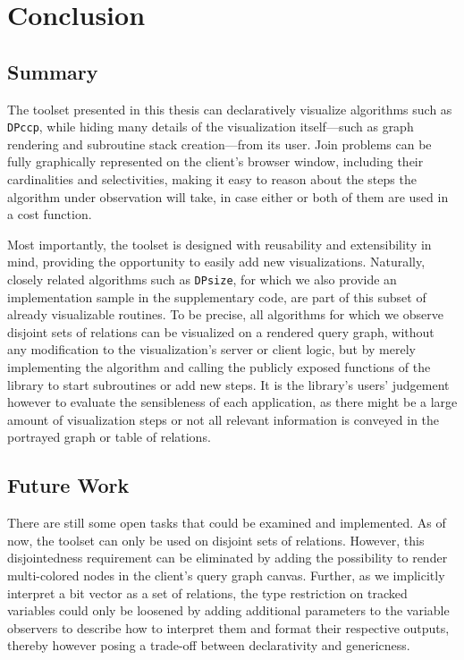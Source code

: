 \section{Conclusion}

\vspace{-0.2cm}
\subsection{Summary}

The toolset presented in this thesis can declaratively visualize algorithms such as \texttt{DPccp}, while hiding many details of the visualization itself—such as graph rendering and subroutine stack creation—from its user. Join problems can be fully graphically represented on the client's browser window, including their cardinalities and selectivities, making it easy to reason about the steps the algorithm under observation will take, in case either or both of them are used in a cost function.

 Most importantly, the toolset is designed with reusability and extensibility in mind, providing the opportunity to easily add new visualizations. Naturally, closely related algorithms such as \texttt{DPsize}\cite{moerkotte2006analysis}, for which we also provide an implementation sample in the supplementary code, are part of this subset of already visualizable routines. To be precise, all algorithms for which we observe disjoint sets of relations can be visualized on a rendered query graph, without any modification to the visualization's server or client logic, but by merely implementing the algorithm and calling the publicly exposed functions of the library to start subroutines or add new steps. It is the library's users' judgement however to evaluate the sensibleness of each application, as there might be a large amount of visualization steps or not all relevant information is conveyed in the portrayed graph or table of relations.

 \vspace{-0.1cm}
\subsection{Future Work}

There are still some open tasks that could be examined and implemented. As of now, the toolset can only be used on disjoint sets of relations. However, this disjointedness requirement can be eliminated by adding the possibility to render multi-colored nodes in the client's query graph canvas.
Further, as we implicitly interpret a bit vector as a set of relations, the type restriction on tracked variables could only be loosened by adding additional parameters to the variable observers to describe how to interpret them and format their respective outputs, thereby however posing a trade-off between declarativity and genericness.

